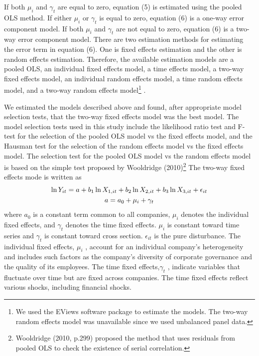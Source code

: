 \documentclass[10pt,a4paper]{article}
\begin{document}
If both  $\mu_{i}$    and   $\gamma_{t}$  are equal to zero, equation (5) is estimated using the pooled OLS method. If either      $\mu_{i}$   or $\gamma_{t}$    is equal to zero, equation (6) is a one-way error component model. If both $\mu_{i}$   and    $\gamma_{t}$  are not equal to zero, equation (6) is a two-way error component model. There are two estimation methods for estimating the error term in equation (6). One is fixed effects estimation and the other is random effects estimation. Therefore, the available estimation models are a pooled OLS, an individual fixed effects model, a time effects model, a two-way fixed effects model, an individual random effects model, a time random effects model, and a two-way random effects model\footnote{We used the EViews software package to estimate the models. The two-way random effects model was unavailable since we used unbalanced panel data.} .

We estimated the models described above and found, after appropriate model selection tests, that the two-way fixed effects model was the best model. The model selection tests used in this study include the likelihood ratio test and F-test for the selection of the pooled OLS model vs the fixed effects model, and the Hausman test for the selection of the random effects model vs the fixed effects model. The selection test for the pooled OLS model vs the random effects model is based on the simple test proposed by Wooldridge (2010)\footnote{Wooldridge (2010, p.299) proposed the method that uses residuals from pooled OLS to check the existence of serial correlation.} 
  The two-way fixed effects mode is written as
\begin{gather}
 \ln Y_{it} = a + b_{1}\ln X_{1,it} + b_{2}\ln X_{2,it} + b_{3} \ln X_{3,it} + \epsilon_{it}  \\
a=a_{0} + \mu_{i} + \gamma_{t}  \notag
\end{gather}
where  $a_{0}$  is a constant term common to all companies,  $\mu_{i}$  denotes the individual fixed effects, and  $\gamma_{t}$   denotes the time fixed effects.   $\mu_{i}$  is constant toward time series and $\gamma_{t}$  is constant toward cross section. $\epsilon_{it}$  is the pure disturbance. The individual fixed effects,  $\mu_{i}$   , account for an individual company's heterogeneity and includes such factors as the company's diversity of corporate governance and the quality of its employees.  The time fixed effects,$\gamma_{t}$ , indicate variables that fluctuate over time but are fixed across companies. The time fixed effects reflect various shocks, including financial shocks. 
  
\end{document}
